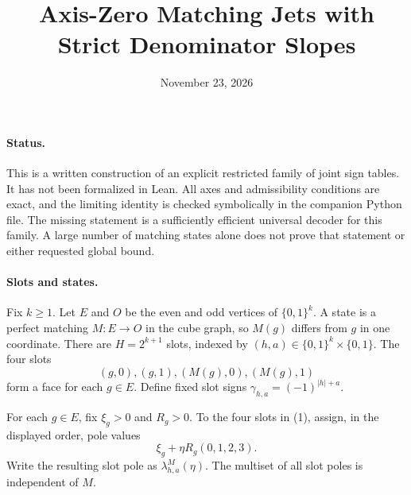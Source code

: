\documentclass[11pt]{article}
\title{Axis-Zero Matching Jets with Strict Denominator Slopes}
\author{}
\date{November 23, 2026}
\begin{document}
\maketitle

\paragraph{Status.}
This is a written construction of an explicit restricted family of
joint sign tables. It has not been formalized in Lean. All axes and
admissibility conditions are exact, and the limiting identity is
checked symbolically in the companion Python file. The missing
statement is a sufficiently efficient universal decoder for this
family. A large number of matching states alone does not prove that
statement or either requested global bound.

\paragraph{Slots and states.}
Fix $k\geq1$. Let $E$ and $O$ be the even and odd vertices of
$\{0,1\}^k$. A state is a perfect matching $M:E\to O$ in the cube
graph, so $M(g)$ differs from $g$ in one coordinate. There are
$H=2^{k+1}$ slots, indexed by $(h,a)\in\{0,1\}^k\times\{0,1\}$.
The four slots
\[
                  (g,0),(g,1),(M(g),0),(M(g),1)
                  \tag{1}
\]
form a face for each $g\in E$. Define fixed slot signs
$\gamma_{h,a}=(-1)^{|h|+a}$.

For each $g\in E$, fix $\xi_g>0$ and $R_g>0$. To the four slots
in (1), assign, in the displayed order, pole values
\[
                  \xi_g+\eta R_g(0,1,2,3).
                  \tag{2}
\]
Write the resulting slot pole as $\lambda^M_{h,a}(\eta)$.
The multiset of all slot poles is independent of $M$.
\end{document}
